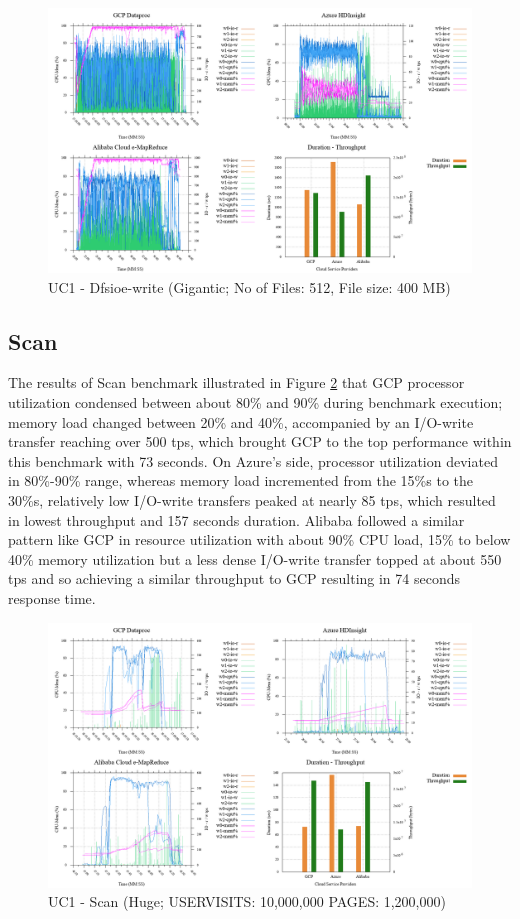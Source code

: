 \documentclass[review]{elsarticle}
\begin{document}
\begin{figure}[p]
	\caption{UC1 - Dfsioe-write (Gigantic; No of Files: 512, File size: 400 MB)}
	\label{fig:uc1-dfsioew-g-cmidt}
	\includegraphics[width=\textwidth]{uc1-dfsioew-g-cmidt}
	\centering
\end{figure}

\subsection{Scan}
The results of Scan benchmark illustrated in Figure \ref{fig:uc1-scan-h-cmidt} that GCP processor utilization condensed between about 80\% and 90\% during benchmark execution; memory load changed between 20\% and 40\%, accompanied by an I/O-write transfer reaching over 500 tps, which brought GCP to the top performance within this benchmark with 73 seconds. On Azure's side, processor utilization deviated in 80\%-90\% range, whereas memory load incremented from the 15\%s to the 30\%s, relatively low I/O-write transfers peaked at nearly 85 tps, which resulted in lowest throughput and 157 seconds duration. Alibaba followed a similar pattern like GCP in resource utilization with about 90\% CPU load, 15\% to below 40\% memory utilization but a less dense I/O-write transfer topped at about 550 tps and so achieving a similar throughput to GCP resulting in 74 seconds response time.

\begin{figure}[p]
	\caption{UC1 - Scan (Huge; USERVISITS: 10,000,000 PAGES: 1,200,000)}
	\label{fig:uc1-scan-h-cmidt}
	\includegraphics[width=\textwidth]{uc1-scan-h-cmidt}
	\centering
\end{figure}
\end{document}
